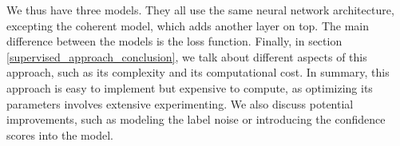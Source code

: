 We thus have three models. They all use the same neural network architecture, excepting the coherent model, which adds another layer on top. The main difference between the models is the loss function. Finally, in section \ref{supervised_approach_conclusion}, we talk about different aspects of this approach, such as its complexity and its computational cost. In summary, this approach is easy to implement but expensive to compute, as optimizing its parameters involves extensive experimenting. We also discuss potential improvements, such as modeling the label noise or introducing the confidence scores into the model.




